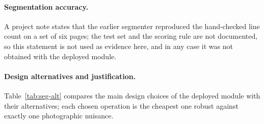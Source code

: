 \paragraph{Segmentation accuracy.}
A project note states that the earlier segmenter reproduced the hand-checked line count on a set of six pages; the test set and the scoring rule are not documented, so this statement is not used as evidence here, and in any case it was not obtained with the deployed module.

\paragraph{Design alternatives and justification.}
Table~\ref{tab:seg-alt} compares the main design choices of the deployed module with their alternatives; each chosen operation is the cheapest one robust against exactly one photographic nuisance.

